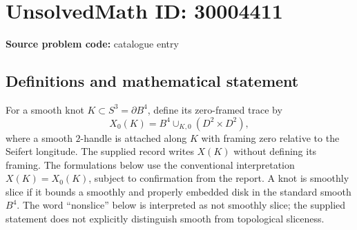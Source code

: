\documentclass[11pt]{article}
\begin{document}
\section*{UnsolvedMath ID: 30004411}
\textbf{Source problem code:} catalogue entry
\subsection{Definitions and mathematical statement}
For a smooth knot \(K\subset S^3=\partial B^4\), define its zero-framed trace by
\[
X_0(K)=B^4\cup_{K,0}(D^2\times D^2),
\]
where a smooth \(2\)-handle is attached along \(K\) with framing zero relative to the Seifert longitude. The supplied record writes \(X(K)\) without defining its framing. The formulations below use the conventional interpretation \(X(K)=X_0(K)\), subject to confirmation from the report. A knot is smoothly slice if it bounds a smoothly and properly embedded disk in the standard smooth \(B^4\). The word ``nonslice'' below is interpreted as not smoothly slice; the supplied statement does not explicitly distinguish smooth from topological sliceness.
\end{document}
